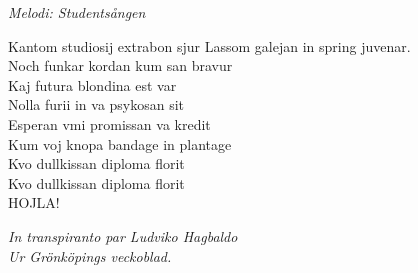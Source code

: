 {\footnotesize\textit{Melodi: Studentsången}}\par
\vspace{10pt}
Kantom studiosij extrabon sjur
Lassom galejan in spring juvenar.\\
Noch funkar kordan kum san bravur\\
Kaj futura blondina est var\\
Nolla furii in va psykosan sit\\
Esperan vmi promissan va kredit\\
Kum voj knopa bandage in plantage\\
Kvo dullkissan diploma florit\\
Kvo dullkissan diploma florit\\
HOJLA!\par
\vspace{10pt}
{\footnotesize\textit{In transpiranto par Ludviko Hagbaldo\\ Ur
    Grönköpings veckoblad.}}
